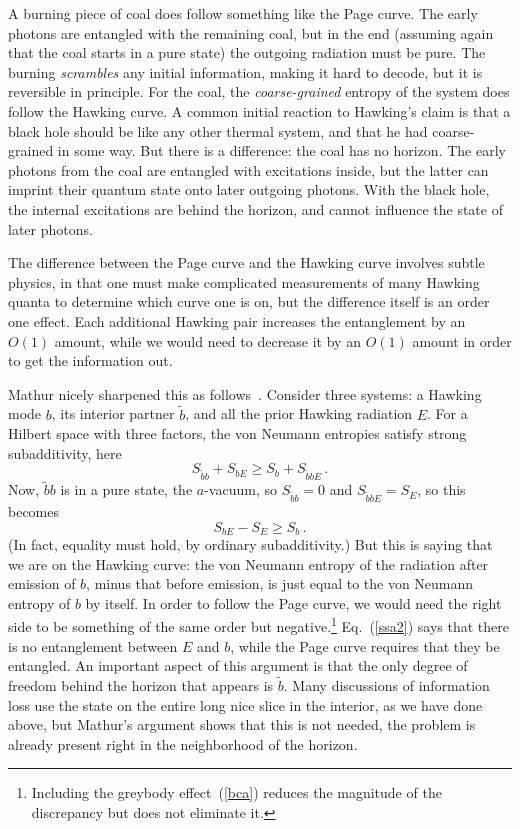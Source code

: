 \documentclass[12pt]{article}
\newcommand{\be}{\begin{equation}}
\newcommand{\ee}{\end{equation}}
\begin{document}
A burning piece of coal does follow something like the Page curve.  The early photons are entangled with the remaining coal, but in the end (assuming again that the coal starts in a pure state) the outgoing radiation must be pure.  The burning {\it scrambles} any initial information, making it hard to decode, but it is reversible in principle.  For the coal, the {\it coarse-grained} entropy of the system does follow the Hawking curve.  A common initial reaction to Hawking's claim is that a black hole should be like any other thermal system, and that he had coarse-grained in some way.   But there is a difference: the coal has no horizon.  The early photons from the coal are entangled with excitations inside, but the latter can imprint their quantum state onto later outgoing photons.  With the black hole, the internal excitations are behind the horizon, and cannot influence the state of later photons. 

The difference between the Page curve and the Hawking curve involves subtle physics, in that one must make  complicated measurements of many Hawking quanta to determine which curve one is on, but the difference itself is an order one effect.  Each additional Hawking pair increases the entanglement by an $O(1)$ amount, while we would need to decrease it by an $O(1)$ amount in order to get the information out.  

Mathur nicely sharpened this as follows~\cite{Mathur:2009hf}.  Consider three systems: a Hawking mode $b$, its interior partner $\tilde b$, and all the prior Hawking radiation $E$.  For a Hilbert space with three factors, the von Neumann entropies satisfy strong subadditivity, here
\be
S_{\tilde b b} + S_{bE} \geq S_b + S_{\tilde b b E}\,. \label{mathur}
\ee
Now, $\tilde b b$ is in a pure state, the $a$-vacuum, so $S_{\tilde b b} = 0$ and $S_{\tilde b b E} = S_E$, so this becomes
\be
S_{bE} - S_{E}\geq S_b   \,.  \label{ssa2}
\ee
(In fact, equality must hold, by ordinary subadditivity.)
But this is saying that we are on the Hawking curve: the von Neumann entropy of the radiation after emission of $b$, minus that before emission, is just equal to the von Neumann entropy of $b$ by itself.  In order to follow the Page curve, we would need the right side to be something of the same order but negative.\footnote{Including the greybody effect~(\ref{bca}) reduces the magnitude of the discrepancy but does not eliminate it.}  Eq.~(\ref{ssa2}) says that there is no entanglement between $E$ and $b$, while the Page curve requires that they be entangled.  An important aspect of this argument is that the only degree of freedom behind the horizon that appears is $\tilde b$.  Many discussions of information loss use the state on the entire long nice slice in the interior, as we have done above, but Mathur's argument shows that this is not needed, the problem is already present right in the neighborhood of the horizon.
\end{document}
